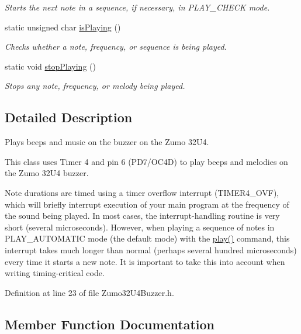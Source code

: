 \begin{DoxyCompactItemize}
\begin{DoxyCompactList}\small\item\em Starts the next note in a sequence, if necessary, in {\ttfamily P\+L\+A\+Y\+\_\+\+C\+H\+E\+CK} mode. \end{DoxyCompactList}\item 
static unsigned char \hyperlink{class_pololu_buzzer_a8045fdf0a144e0b71a5b223a0ef34027}{is\+Playing} ()
\begin{DoxyCompactList}\small\item\em Checks whether a note, frequency, or sequence is being played. \end{DoxyCompactList}\item 
static void \hyperlink{class_pololu_buzzer_a233fe0ffe5f23582b1c55beaa718d527}{stop\+Playing} ()
\begin{DoxyCompactList}\small\item\em Stops any note, frequency, or melody being played. \end{DoxyCompactList}\end{DoxyCompactItemize}


\subsection{Detailed Description}
Plays beeps and music on the buzzer on the Zumo 32\+U4. 

This class uses Timer 4 and pin 6 (P\+D7/\+O\+C4D) to play beeps and melodies on the Zumo 32\+U4 buzzer.

Note durations are timed using a timer overflow interrupt ({\ttfamily T\+I\+M\+E\+R4\+\_\+\+O\+VF}), which will briefly interrupt execution of your main program at the frequency of the sound being played. In most cases, the interrupt-\/handling routine is very short (several microseconds). However, when playing a sequence of notes in {\ttfamily P\+L\+A\+Y\+\_\+\+A\+U\+T\+O\+M\+A\+T\+IC} mode (the default mode) with the {\ttfamily \hyperlink{class_pololu_buzzer_a22f45ef7cdf9dc8fc54e617244368277}{play()}} command, this interrupt takes much longer than normal (perhaps several hundred microseconds) every time it starts a new note. It is important to take this into account when writing timing-\/critical code. 

Definition at line 23 of file Zumo32\+U4\+Buzzer.\+h.



\subsection{Member Function Documentation}
\mbox{\label{class_pololu_buzzer_a8045fdf0a144e0b71a5b223a0ef34027}} 

